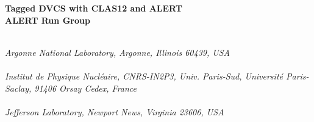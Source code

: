 \begin{titlepage}
     \begin{center}
       \vspace*{-1.5cm}
        \\
       \vspace*{0.2cm}
        \\
       \vspace*{2.3cm}
       \noindent \Huge \textbf{Tagged DVCS with CLAS12 and ALERT} \\
       \vspace*{0.6cm}
       \noindent \Large \textbf{ALERT Run Group} \\
       \vspace*{0.7cm}
     \end{center}
   
     \begin{center}
       \vspace*{1.0cm}
        \\
       \vspace*{0.2cm}
       \noindent \emph{Argonne National Laboratory, Argonne, Illinois 60439, USA} \\
       \vspace*{0.7cm}
        \\
       \vspace*{0.2cm}
       \noindent \emph{Institut de Physique Nucl\'eaire, CNRS-IN2P3, Univ. Paris-Sud, Universit\'e Paris-Saclay, 91406 Orsay Cedex, France} \\
       \vspace*{0.7cm}
        \\
       \vspace*{0.2cm}
       \noindent \emph{Jefferson Laboratory, Newport News, Virginia 23606, USA} \\
       \vspace*{0.7cm}
       \noindent {} \\
       \vspace*{0.2cm}
       \noindent \emph{} \\
       \vspace*{0.7cm}
     \end{center}

\date{\today}
     

\end{titlepage}
\sloppy

\titlepage

